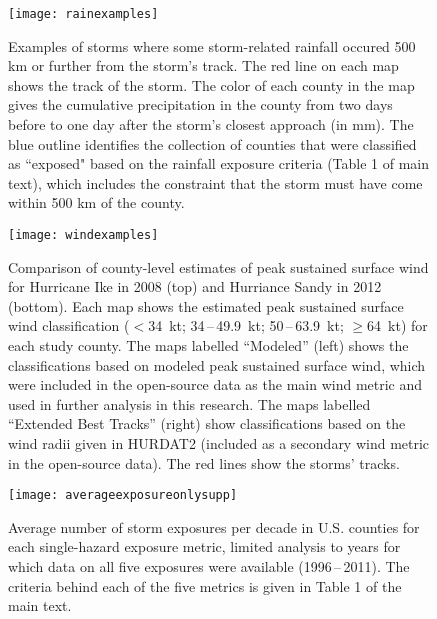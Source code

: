 \documentclass[11pt, titlepage, twoside]{article}
\begin{document}
\begin{figure}[tbhp!]
\centering
\texttt{[image: rainexamples]}
\caption{Examples of storms where some storm-related rainfall occured
         500 \si{\kilo\metre} or further from the storm's track. 
	 The red line on each map shows the track of the storm. 
	 The color of each county in the map gives the cumulative 
	 precipitation in the county from two days before to one day after
	 the storm's closest approach (in \si{\milli\metre}). The blue 
	 outline identifies the collection of counties
	 that were classified as ``exposed" based on the rainfall exposure 
	 criteria (Table 1 of main text), which includes the constraint
	 that the storm must have come within 500 \si{\kilo\metre} of the 
	 county. }
\label{fig:rainexamples}
\end{figure}

\clearpage 

\begin{figure}[tbhp!]
\centering
\texttt{[image: windexamples]}
\caption{Comparison of county-level estimates of peak sustained surface wind 
	for Hurricane Ike in 2008 (top) and Hurriance Sandy in 2012 (bottom). 
	Each map shows the estimated peak sustained surface wind 
	classification ($<$34~kt; 34\,--\,49.9~kt; 
	50\,--\,63.9~kt; $\ge$64~kt) for each study county. 
	The maps labelled ``Modeled'' (left)
	shows the classifications based on modeled peak sustained surface wind,
	which were included in the open-source data as the main 
	wind metric and used in further analysis in this research. The maps
	labelled ``Extended Best Tracks'' (right) show classifications based on the 
	wind radii given in \ac{HURDAT2} (included as a secondary wind 
	metric in the open-source data). The red lines show the storms' 
	tracks.
	}
\label{fig:windexamples}
\end{figure}

\clearpage

\begin{figure}[tbhp!]
\centering
\texttt{[image: averageexposureonlysupp]}
\caption{Average number of storm exposures per decade in U.S. counties for each 
	single-hazard exposure metric, limited analysis to years for which data on all five 
	exposures were available (1996\,--\,2011). The criteria behind each of 
	the five metrics is given in Table 1 of the main text. 	
	} 
\label{fig:averageexposuresupp}
\end{figure}

\clearpage 
\end{document}

